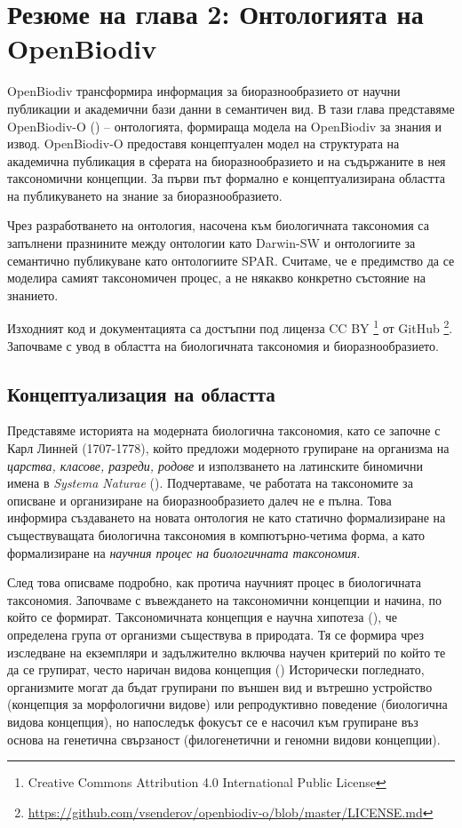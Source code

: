 \chapter{Резюме на глава 2: Онтологията на OpenBiodiv}
\label{chapter-ontology}

OpenBiodiv трансформира информация за биоразнообразието от научни публикации и академични бази данни в семантичен вид. В тази глава представяме OpenBiodiv-O (\cite{senderov_openbiodiv-o:_2018}) -- онтологията, формираща модела на OpenBiodiv за знания и извод. OpenBiodiv-O предоставя концептуален модел на структурата на академична публикация в сферата на биоразнообразието и на съдържаните в нея таксономични концепции. За първи път формално е концептуализирана областта на публикуването на знание за биоразнообразието.

Чрез разработването на онтология, насочена към биологичната таксономия са запълнени празнините между онтологии като Darwin-SW и онтологиите за семантично публикуване като онтологиите SPAR. Считаме, че е предимство да се моделира самият таксономичен процес, а не някакво конкретно състояние на знанието.

Изходният код и документацията са достъпни под лиценза CC BY \footnote {Creative Commons Attribution 4.0 International Public License} от GitHub \footnote {\url{https://github.com/vsenderov/openbiodiv-o/blob/master/LICENSE.md}}. Започваме с увод в областта на биологичната таксономия и биоразнообразието.

\section{Концептуализация на областта}

Представяме историята на модерната биологична таксономия, като се започне с Карл Линней (1707-1778), който предложи модерното групиране на организма на \emph{царства, класове, разреди, родове} и използването на латинските биномични имена в \emph{Systema Naturae} (\cite {linnaeus_systema_1758}). Подчертаваме, че работата на таксономите за описване и организиране на биоразнообразието далеч не е пълна. Това информира създаването на новата онтология не като статично формализиране на съществуващата биологична таксономия в компютърно-четима форма, а като формализиране на \emph{научния процес на биологичната таксономия}.

След това описваме подробно, как протича научният процес в биологичната таксономия. Започваме с въвеждането на таксономични концепции и начина, по който се формират. Таксономичната концепция е научна хипотеза (\cite{deans_time_2012}), че определена група от организми съществува в природата. Тя се формира чрез изследване на екземпляри и задължително включва научен критерий по който те да се групират, често наричан видова концепция (\cite {mallet_species_2001}) Исторически погледнато, организмите могат да бъдат групирани по външен вид и вътрешно устройство (концепция за морфологични видове) или репродуктивно поведение (биологична видова концепция), но напоследък фокусът се е насочил към групиране въз основа на генетична свързаност (филогенетични и геномни видови концепции).


